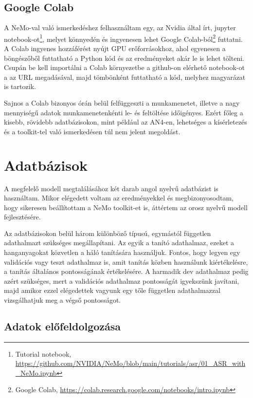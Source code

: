 \subsection{Google Colab}

A NeMo-val való ismerkedéshez felhasználtam egy, az Nvidia által írt, jupyter notebook-ot\footnote{Tutorial notebook, \url{https://github.com/NVIDIA/NeMo/blob/main/tutorials/asr/01_ASR_with_NeMo.ipynb}}, melyet könnyedén és ingyenesen lehet Google Colab-ból\footnote{Google Colab, \url{https://colab.research.google.com/notebooks/intro.ipynb}} futtatni. A Colab ingyenes hozzáférést nyújt GPU erőforrásokhoz, ahol egyenesen a böngészőből futtatható a Python kód és az eredményeket akár le is lehet tölteni. Csupán be kell importálni a Colab környezetbe a github-on elérhető notebook-ot a az URL megadásával, majd tömbönként futtatható a kód, melyhez magyarázat is tartozik.

Sajnos a Colab bizonyos órán belül felfüggeszti a munkamenetet, illetve a nagy mennyiségű adatok munkamenetenkénti le- és feltöltése időigényes. Ezért főleg a kisebb, rövidebb adatbázisokon, mint például az AN4-en, lehetséges a kísérletezés és a toolkit-tel való ismerkedésen túl nem jelent megoldást.

\section{Adatbázisok}

A megfelelő modell megtalálásához két darab angol nyelvű adatbázist is használtam. Mikor elégedett voltam az eredményekkel és megbizonyosodtam, hogy sikeresen beállítottam a NeMo toolkit-et is, áttértem az orosz nyelvű modell fejlesztésére.

Az adatbázisokon belül három különböző típusú, egymástól független adathalmazt szükséges megállapítani. Az egyik a tanító adathalmaz, ezeket a hanganyagokat közvetlen a háló tanítására használjuk. Fontos, hogy legyen egy validációs vagy teszt adathalmaz is, amit tanítás közben használunk kiértékelésre, a tanítás általános pontosságának értékelésére. A harmadik dev adathalmaz pedig azért szükséges, mert a validációs adathalmaz pontosságát igyekszünk javítani, majd amikor ezzel elégedettek vagyunk egy tőle független adathalmazzal vizsgálhatjuk meg a végső pontosságot.

\subsection{Adatok előfeldolgozása}

